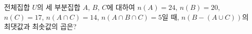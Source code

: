 전체집합 $U$의 세 부분집합 $A$, $B$, $C$에 대하여 $n(A)=24$, $n(B)=20$, $n(C)=17$, $n(A\cap C)=14$, $n(A\cap B\cap C)=5$일 때, $n(B-(A\cup C))$의 최댓값과 최솟값의 곱은?
